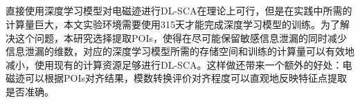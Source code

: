 {{	%
	\subsection{\yuchuli}\label{subs:selectpoi}

	直接使用深度学习模型对电磁迹进行DL-SCA在理论上可行，但是在实践中所需的计算量巨大，本文实验环境需要使用315天才能完成深度学习模型的训练。为了解决这个问题，本研究选择提取POIs，使得在尽可能保留敏感信息泄漏的同时减少信息泄漏的维数，对应的深度学习模型所需的存储空间和训练的计算量可以有效地减小，使用现有的计算资源足够进行DL-SCA。这样做还带来一个额外的好处：电磁迹可以根据POIs对齐结果，模数转换评价对齐程度可以直观地反映特征点提取是否准确。
{	
	
%	
%	
%	
%	
%	
%		
%	
	
}}}
